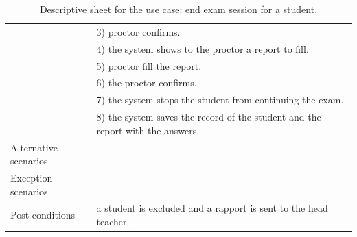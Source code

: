 \documentclass[]{uc2pfecaneva}
\begin{document}
\begin{table}[h]
\begin{tabularx}{\textwidth}{|l|X|}
            & 3) proctor confirms.                                                                                                \\
            & 4) the system shows to the proctor a report to fill.                                                                   \\
            & 5) proctor fill the report.                                                                                            \\
            & 6) the proctor confirms.                                                                                                  \\
            & 7) the system stops the student from continuing the exam.                                                              \\
            & 8) the system saves the record of the student and the report with the answers.                                         \\ \hline
            Alternative scenarios
            \\ \hline
            Exception scenarios
            \\ \hline
            Post conditions
            & a student is excluded and a rapport is sent to the head teacher.                                                       \\ \hline
        \end{tabularx}
        \caption{Descriptive sheet for the use case: end exam session for a student.}
        \label{table:5}
    \end{table}
    \clearpage
\end{document}
